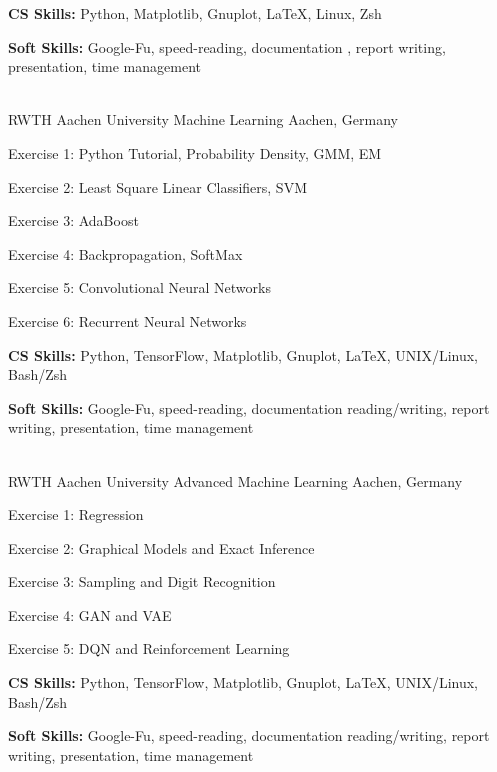 \begin{cventries}
{\begin{cvitems}
        \item {\textbf{CS Skills:} Python, Matplotlib, Gnuplot, \LaTeX, Linux, Zsh}
        \item {\textbf{Soft Skills:} Google-Fu, speed-reading, documentation , report writing, presentation, time management}
      \end{cvitems}
    }\\
  \cventry
    {RWTH Aachen University} %
    {Machine Learning} %
    {Aachen, Germany} %
    {} %
    {
      \begin{cvitems} %
      \item Exercise 1: Python Tutorial, Probability Density, GMM, EM
      \item Exercise 2: Least Square Linear Classifiers, SVM
      \item Exercise 3: AdaBoost
      \item Exercise 4: Backpropagation, SoftMax
      \item Exercise 5: Convolutional Neural Networks
      \item Exercise 6: Recurrent Neural Networks
        \item {\textbf{CS Skills:} Python, TensorFlow, Matplotlib, Gnuplot, \LaTeX, UNIX/Linux, Bash/Zsh}
        \item {\textbf{Soft Skills:} Google-Fu, speed-reading, documentation reading/writing, report writing, presentation, time management}
      \end{cvitems}
    }\\
  \cventry
    {RWTH Aachen University} %
    {Advanced Machine Learning} %
    {Aachen, Germany} %
    {} %
    {
      \begin{cvitems} %
      \item Exercise 1: Regression
      \item Exercise 2: Graphical Models and Exact Inference
      \item Exercise 3: Sampling and Digit Recognition
      \item Exercise 4: GAN and VAE
      \item Exercise 5: DQN and Reinforcement Learning
        \item {\textbf{CS Skills:} Python, TensorFlow, Matplotlib, Gnuplot, \LaTeX, UNIX/Linux, Bash/Zsh}
        \item {\textbf{Soft Skills:} Google-Fu, speed-reading, documentation reading/writing, report writing, presentation, time management}
      \end{cvitems}
    }



\end{cventries}
